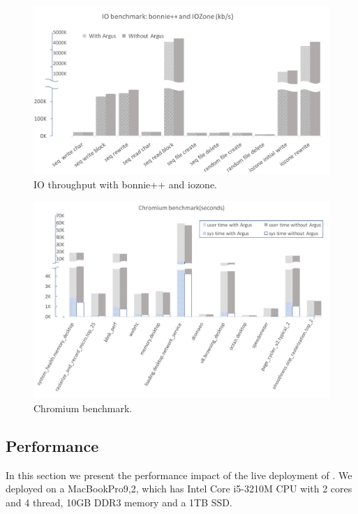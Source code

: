 \begin{figure}
\centering
\includegraphics[width=\columnwidth]{./figures/performance_io.pdf}
\caption{IO throughput with bonnie++ and iozone.}
\label{fig:iothroughput}
\end{figure}

\begin{figure}
	\centering
		\includegraphics[width=\columnwidth]{./figures/performance_cr.pdf}
	\caption{Chromium benchmark.}
	\label{fig:chromium benchmark}
\end{figure}


\subsection{Performance} \label{sec:evaluation}

In this section we present the performance impact of the live deployment of
\xxx. We deployed \xxx on a MacBookPro9,2, which has Intel Core i5-3210M CPU with
2 cores and 4 thread, 10GB DDR3 memory and a 1TB SSD.

